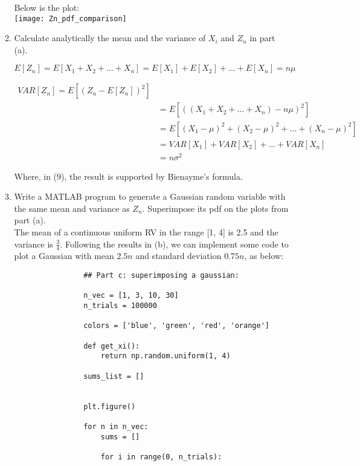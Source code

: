 \documentclass[]{article}
\begin{document}
\begin{enumerate}
\begin{enumerate}
			Below is the plot:\\
			
			\texttt{[image: Zn\_pdf\_comparison]}
			
			\item Calculate analytically the mean and the variance of $X_i$ and $Z_n$ in part (a).
			
			\[
			E[Z_n] = E[X_1 + X_2 + \ldots + X_n]
			=E[X_1] + E[X_2] + \ldots + E[X_n]
			= n\mu
			\]
			
			\pagebreak
			\begin{equation}
				\begin{split}
					VAR[Z_n] = E[(Z_n - E[Z_n])^2] \\
					& = E[((X_1 + X_2 + \ldots + X_n) - n\mu)^2] \\   
					& = E[(X_1 - \mu)^2 + (X_2 - \mu)^2 + \ldots + (X_n - \mu)^2] \\
					& = VAR[X_1] + VAR[X_2] + \ldots + VAR[X_n] \\
					& = n\sigma^2
				\end{split}
			\end{equation}
		
			Where, in (9), the result is supported by Bienayme's formula.
			
			\item Write a MATLAB program to generate a Gaussian random variable with the same mean and variance as $Z_n$. Superimpose its pdf on the plots from part (a).\\
			
			The mean of a continuous uniform RV in the range [1, 4] is 2.5 and the variance is $\frac{3}{4}$. Following the results in (b), we can implement some code to plot a Gaussian with mean $2.5n$ and standard deviation $0.75n$, as below:
			
			\begin{lstlisting}
				## Part c: superimposing a gaussian:
				
				n_vec = [1, 3, 10, 30]
				n_trials = 100000
				
				colors = ['blue', 'green', 'red', 'orange']
				
				def get_xi():
					return np.random.uniform(1, 4)
				
				sums_list = []
				
				
				plt.figure()
				
				for n in n_vec:
					sums = []
				
					for i in range(0, n_trials):
				

\end{lstlisting}
\end{enumerate}
\end{enumerate}
\end{document}
